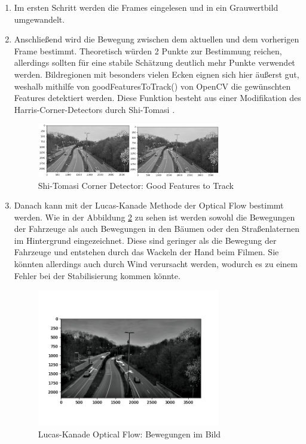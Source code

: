 \documentclass[conference]{IEEEtran}
\begin{document}
	\begin{enumerate}
		\item Im ersten Schritt werden die Frames eingelesen und in ein Grauwertbild umgewandelt.
		
		\item Anschließend wird die Bewegung zwischen dem aktuellen und dem vorherigen Frame bestimmt. Theoretisch würden 2 Punkte zur Bestimmung reichen, allerdings sollten für eine stabile Schätzung deutlich mehr Punkte verwendet werden.
		Bildregionen mit besonders vielen Ecken eignen sich hier äußerst gut, weshalb mithilfe von goodFeaturesToTrack() von OpenCV die gewünschten Features detektiert werden.
		Diese Funktion besteht aus einer Modifikation des Harris-Corner-Detectors durch Shi-Tomasi \cite{s3}.
		\begin{figure}[!h]
			\begin{center}
				\includegraphics[width=8cm]{Media/VideoStab.png}
				\caption{Shi-Tomasi Corner Detector: Good Features to Track}
				\label{VS1}
			\end{center}
		\end{figure}
		
		\item Danach kann mit der Lucas-Kanade Methode der Optical Flow \cite{s2} bestimmt werden. Wie in der Abbildung \ref{VS2} zu sehen ist werden sowohl die Bewegungen der Fahrzeuge als auch Bewegungen in den Bäumen oder den Straßenlaternen im Hintergrund eingezeichnet. Diese sind geringer als die Bewegung der Fahrzeuge und entstehen durch das Wackeln der Hand beim Filmen. Sie könnten allerdings auch durch Wind verursacht werden, wodurch es zu einem Fehler bei der Stabilisierung kommen könnte.
		\begin{figure}[!h]
			\begin{center}
				\includegraphics[width=8cm]{Media/VideoStab2.png}
				\caption{Lucas-Kanade Optical Flow: Bewegungen im Bild}
				\label{VS2}
			\end{center}
		\end{figure}
		

\end{enumerate}
\end{document}
